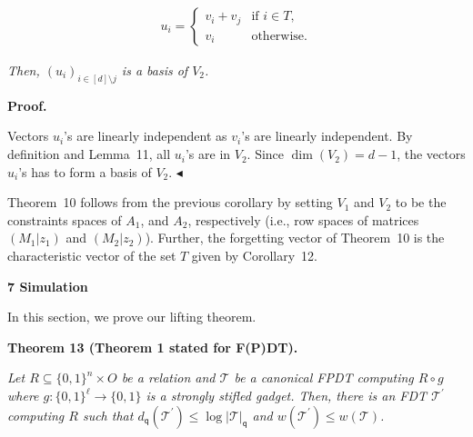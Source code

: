 \documentclass[10pt,a4paper]{article}
\begin{document}
\[\begin{gathered}
u_{i}=\begin{cases}v_{i}+v_{j}&\text{if $i\in T$,}\\
v_{i}&\text{otherwise.}\end{cases}
\end{gathered}\]


\emph{Then, $(u_{i})_{i\in[d]\setminus j}$ is a basis of $V_{2}$.}\par







\par\medskip\noindent\textbf{Proof.}\par




Vectors $u_{i}$’s are linearly independent as $v_{i}$’s are linearly independent.
By definition and Lemma 11, all $u_{i}$’s are in $V_{2}$.
Since $\dim(V_{2})=d-1$, the vectors $u_{i}$’s has to form a basis of $V_{2}$.
$\blacktriangleleft$\par




Theorem 10 follows from the previous corollary by setting $V_{1}$ and $V_{2}$ to be the constraints spaces of $A_{1}$, and $A_{2}$, respectively (i.e., row spaces of matrices $(M_{1}|z_{1})$ and $(M_{2}|z_{2})$). Further, the forgetting vector of Theorem 10 is the characteristic vector of the set $T$ given by Corollary 12.\par






\par\medskip\noindent\textbf{
7 Simulation}\par




In this section, we prove our lifting theorem.\par






\par\medskip\noindent\textbf{
\textbf{Theorem 13}\textbf{ }(Theorem 1 stated for F(P)DT)\textbf{.}
}\par



\emph{Let $R\subseteq\{0,1\}^{n}\times O$ be a relation and $\mathcal{T}$ be a canonical FPDT computing $R\circ g$ where $g:\{0,1\}^{\ell}\to\{0,1\}$ is a strongly stifled gadget.
Then, there is an FDT $\mathcal{T}^{\prime}$ computing $R$ such that $d_{\mathsf{q}}(\mathcal{T}^{\prime})\leq\log|\mathcal{T}|_{\mathsf{q}}$ and $w(\mathcal{T}^{\prime})\leq w(\mathcal{T})$.}\par
\end{document}

